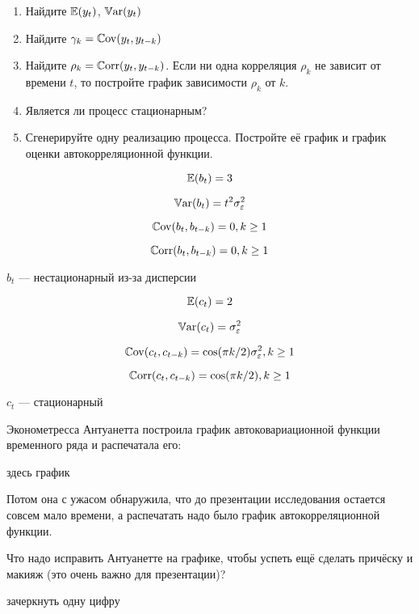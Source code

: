 \begin{problem}
\begin{enumerate}
\item Найдите $\operatorname{\mathbb{E}}(y_t)$, $\operatorname{\mathbb{V}\mathrm{ar}}(y_t)$
\item Найдите $\gamma_k = \operatorname{\mathbb{C}\mathrm{ov}}(y_t, y_{t-k})$
\item Найдите $\rho_k = \operatorname{\mathbb{C}\mathrm{orr}}(y_t,y_{t-k})$. 
Если ни одна корреляция $\rho_k$ не зависит от времени $t$, то постройте график зависимости $\rho_k$ от $k$.
\item Является ли процесс стационарным?
\item Сгенерируйте одну реализацию процесса. Постройте её график и график оценки автокорреляционной функции.
\end{enumerate}


\begin{sol}

\[
\operatorname{\mathbb{E}}(b_t) = 3
\]

\[
\operatorname{\mathbb{V}\mathrm{ar}}(b_t) = t^2 \sigma^2_{\varepsilon}
\]

\[
\operatorname{\mathbb{C}\mathrm{ov}}(b_t, b_{t-k}) = 0, k \geq 1
\]

\[
\operatorname{\mathbb{C}\mathrm{orr}}(b_t, b_{t-k}) = 0, k \geq 1
\]

$b_t$ — нестационарный из-за дисперсии


\[
\operatorname{\mathbb{E}}(c_t) = 2
\]

\[
\operatorname{\mathbb{V}\mathrm{ar}}(c_t) = \sigma^2_{\varepsilon}
\]

\[
\operatorname{\mathbb{C}\mathrm{ov}}(c_t, c_{t-k}) = \cos( \pi k /2)\sigma^2_{\varepsilon}, k \geq 1
\]

\[
\operatorname{\mathbb{C}\mathrm{orr}}(c_t, c_{t-k}) = \cos( \pi k /2), k \geq 1
\]

$c_t$ — стационарный
\end{sol}
\end{problem}





\begin{problem}
Эконометресса Антуанетта построила график автоковариационной функции временного ряда и распечатала его:

здесь график

Потом она с ужасом обнаружила, что до презентации исследования остается совсем мало времени, 
а распечатать надо было график автокорреляционной функции. 

Что надо исправить Антуанетте на графике, чтобы успеть ещё сделать причёску и макияж (это очень важно для презентации)?



\begin{sol}
зачеркнуть одну цифру
\end{sol}
\end{problem}


